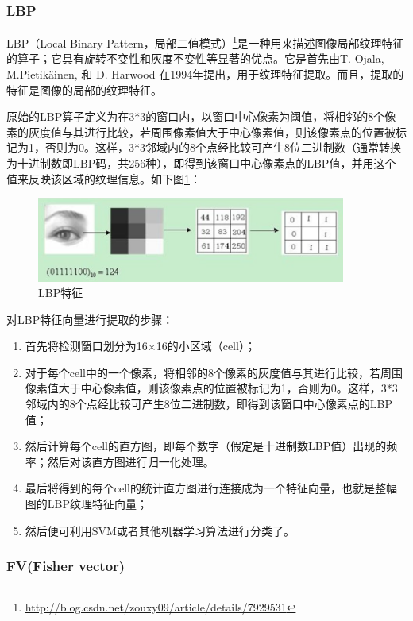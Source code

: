 \documentclass[12pt]{article}
\begin{document}
\subsubsection{LBP}

LBP（Local Binary Pattern，局部二值模式）\footnote{\url{http://blog.csdn.net/zouxy09/article/details/7929531}}是一种用来描述图像局部纹理特征的算子；它具有旋转不变性和灰度不变性等显著的优点。它是首先由T. Ojala, M.Pietikäinen, 和 D. Harwood 在1994年提出\cite{ojala1994performance}，用于纹理特征提取。而且，提取的特征是图像的局部的纹理特征。
 
 原始的LBP算子定义为在3*3的窗口内，以窗口中心像素为阈值，将相邻的8个像素的灰度值与其进行比较，若周围像素值大于中心像素值，则该像素点的位置被标记为1，否则为0。这样，3*3邻域内的8个点经比较可产生8位二进制数（通常转换为十进制数即LBP码，共256种），即得到该窗口中心像素点的LBP值，并用这个值来反映该区域的纹理信息。如下图\ref{fig:lbp}：
    \begin{figure}[!ht]
    \centering
    \includegraphics[width=4in]{LBP}
    \caption{LBP特征}
    \label{fig:lbp}
    \end{figure}
   
对LBP特征向量进行提取的步骤：
\begin{enumerate}
    \item 首先将检测窗口划分为16×16的小区域（cell）；
    \item 对于每个cell中的一个像素，将相邻的8个像素的灰度值与其进行比较，若周围像素值大于中心像素值，则该像素点的位置被标记为1，否则为0。这样，3*3邻域内的8个点经比较可产生8位二进制数，即得到该窗口中心像素点的LBP值；
    \item 然后计算每个cell的直方图，即每个数字（假定是十进制数LBP值）出现的频率；然后对该直方图进行归一化处理。
    \item 最后将得到的每个cell的统计直方图进行连接成为一个特征向量，也就是整幅图的LBP纹理特征向量；
    \item 然后便可利用SVM或者其他机器学习算法进行分类了。
\end{enumerate}

\subsubsection{FV(Fisher vector)}
   
\end{document}
